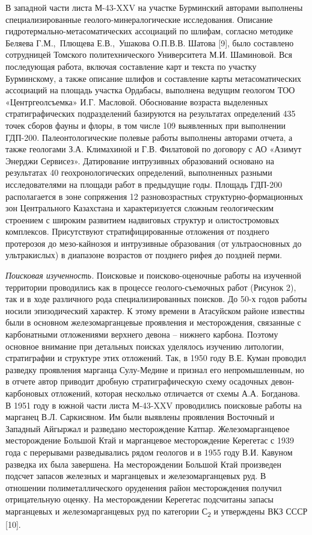 \begin{multicols}{2}
В западной части листа М-43-XXV на участке Бурминский авторами выполнены
специализированные геолого-минералогические исследования. Описание
гидротермально-метасоматических ассоциаций по шлифам, согласно методике
Беляева Г.М.,~Плющева Е.В.,~Ушакова О.П.В.В. Шатова {[}9{]}, было
составлено сотрудницей Томского политехнического Университета М.И.
Шаминовой. Вся последующая работа, включая составление карт и текста по
участку Бурминскому, а также описание шлифов и составление карты
метасоматических ассоциаций на площадь участка Ордабасы, выполнена
ведущим геологом ТОО «Центргеолсъемка» И.Г. Масловой. Обоснование
возраста выделенных стратиграфических подразделений базируются на
результатах определений 435 точек сборов фауны и флоры, в том числе 109
выявленных при выполнении ГДП-200. Палеонтологические полевые работы
выполнены авторами отчета, а также геологами З.А. Климахиной и Г.В.
Филатовой по договору с АО «Азимут Энерджи Сервисез». Датирование
интрузивных образований основано на результатах 40 геохронологических
определений, выполненных разными исследователями на площади работ в
предыдущие годы. Площадь ГДП-200 располагается в зоне сопряжения 12
разновозрастных структурно-формационных зон Центрального Казахстана и
характеризуется сложным геологическим строением с широким развитием
надвиговых структур и олистостромовых комплексов. Присутствуют
стратифицированные отложения от позднего протерозоя до мезо-кайнозоя и
интрузивные образования (от ультраосновных до ультракислых) в диапазоне
возрастов от позднего рифея до поздней перми.

\emph{Поисковая изученность.} Поисковые и поисково-оценочные работы на
изученной территории проводились как в процессе геолого-съемочных работ
(Рисунок 2), так и в ходе различного рода специализированных поисков. До
50-х годов работы носили эпизодический характер. К этому времени в
Атасуйском районе известны были в основном железомарганцевые проявления
и месторождения, связанные с карбонатными отложениями верхнего девона --
нижнего карбона. Поэтому основное внимание при детальных поисках
уделялось изучению литологии, стратиграфии и структуре этих отложений.
Так, в 1950 году В.Е. Куман проводил разведку проявления марганца
Сулу-Медине и признал его непромышленным, но в отчете автор приводит
дробную стратиграфическую схему осадочных девон-карбоновых отложений,
которая несколько отличается от схемы А.А. Богданова. В 1951 году в
южной части листа М-43-XXV проводились поисковые работы на марганец В.Л.
Саркисяном. Им были выявлены проявления Восточный и Западный Айгыржал и
разведано месторождение Катпар. Железомарганцевое месторождение Большой
Ктай и марганцевое месторождение Керегетас с 1939 года с перерывами
разведывались рядом геологов и в 1955 году В.И. Кавуном разведка их была
завершена. На месторождении Большой Ктай произведен подсчет запасов
железных и марганцевых и железомарганцевых руд. В отношении
полиметаллического оруденения район месторождения получил отрицательную
оценку. На месторождении Керегетас подсчитаны запасы марганцевых и
железомарганцевых руд по категории С\textsubscript{2} и утверждены ВКЗ
СССР {[}10{]}.


\end{multicols}

